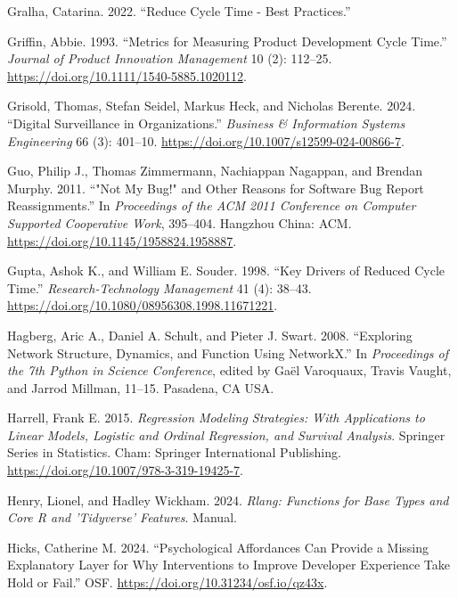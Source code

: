 \documentclass[
]{article}
\newlength{\cslhangindent}
\newenvironment{CSLReferences}[2] %
 {\begin{list}{}{%
  \setlength{\itemindent}{0pt}
  \setlength{\leftmargin}{0pt}
  \setlength{\parsep}{0pt}
  \ifodd #1
   \setlength{\leftmargin}{\cslhangindent}
   \setlength{\itemindent}{-1\cslhangindent}
  \fi
  \setlength{\itemsep}{#2\baselineskip}}}
 {\end{list}}
\begin{document}
\begin{CSLReferences}{1}{0}
Gralha, Catarina. 2022. {``Reduce Cycle Time - Best Practices.''}

Griffin, Abbie. 1993. {``Metrics for {Measuring Product Development
Cycle Time}.''} \emph{Journal of Product Innovation Management} 10 (2):
112--25. \url{https://doi.org/10.1111/1540-5885.1020112}.

Grisold, Thomas, Stefan Seidel, Markus Heck, and Nicholas Berente. 2024.
{``Digital {Surveillance} in {Organizations}.''} \emph{Business \&
Information Systems Engineering} 66 (3): 401--10.
\url{https://doi.org/10.1007/s12599-024-00866-7}.

Guo, Philip J., Thomas Zimmermann, Nachiappan Nagappan, and Brendan
Murphy. 2011. {``"{Not} My Bug!" and Other Reasons for Software Bug
Report Reassignments.''} In \emph{Proceedings of the {ACM} 2011
Conference on {Computer} Supported Cooperative Work}, 395--404. Hangzhou
China: ACM. \url{https://doi.org/10.1145/1958824.1958887}.

Gupta, Ashok K., and William E. Souder. 1998. {``Key {Drivers} of
{Reduced Cycle Time}.''} \emph{Research-Technology Management} 41 (4):
38--43. \url{https://doi.org/10.1080/08956308.1998.11671221}.

Hagberg, Aric A., Daniel A. Schult, and Pieter J. Swart. 2008.
{``Exploring Network Structure, Dynamics, and Function Using
{NetworkX}.''} In \emph{Proceedings of the 7th Python in Science
Conference}, edited by Gaël Varoquaux, Travis Vaught, and Jarrod
Millman, 11--15. Pasadena, CA USA.

Harrell, Frank E. 2015. \emph{Regression {Modeling Strategies}: {With
Applications} to {Linear Models}, {Logistic} and {Ordinal Regression},
and {Survival Analysis}}. Springer {Series} in {Statistics}. Cham:
Springer International Publishing.
\url{https://doi.org/10.1007/978-3-319-19425-7}.

Henry, Lionel, and Hadley Wickham. 2024. \emph{Rlang: {Functions} for
Base Types and Core {R} and 'Tidyverse' Features}. Manual.

Hicks, Catherine M. 2024. {``Psychological {Affordances Can Provide} a
{Missing Explanatory Layer} for {Why Interventions} to {Improve
Developer Experience Take Hold} or {Fail}.''} OSF.
\url{https://doi.org/10.31234/osf.io/qz43x}.


\end{CSLReferences}
\end{document}
